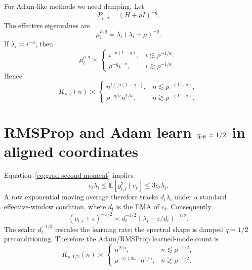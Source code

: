 \documentclass[11pt]{article}
\newcommand{\E}{\mathbb{E}}
\begin{document}
For Adam-like methods we need damping.  Let
\begin{equation}
    P_{\rho,q}=(H+\rho I)^{-q}.
\end{equation}
The effective eigenvalues are
\begin{equation}
    \mu_i^{\rho,q}=\lambda_i(\lambda_i+\rho)^{-q}.
\end{equation}
If $\lambda_i\asymp i^{-a}$, then
\begin{equation}
\label{eq:two-slope-q}
    \mu_i^{\rho,q}\asymp
    \begin{cases}
        i^{-a(1-q)}, & i\lesssim \rho^{-1/a},\\
        \rho^{-q}i^{-a}, & i\gtrsim \rho^{-1/a}.
    \end{cases}
\end{equation}
Hence
\begin{equation}
\label{eq:k-rho-q}
K_{\rho,q}(n)
\asymp
\begin{cases}
    n^{1/[a(1-q)]}, & n\lesssim \rho^{-(1-q)},\\
    \rho^{-q/a}n^{1/a}, & n\gtrsim \rho^{-(1-q)}.
\end{cases}
\end{equation}

\section{RMSProp and Adam learn $q_{\rm eff}=1/2$ in aligned coordinates}

Equation~\eqref{eq:grad-second-moment} implies
\begin{equation}
    c_t\lambda_i\le \E[g_{t,i}^2\mid e_t]\le 3c_t\lambda_i.
\end{equation}
A raw exponential moving average therefore tracks $d_t\lambda_i$ under a standard effective-window condition, where $d_t$ is the EMA of $c_t$.  Consequently
\begin{equation}
    (v_{t,i}+\epsilon)^{-1/2}
    \asymp
    d_t^{-1/2}(\lambda_i+\epsilon/d_t)^{-1/2}.
\end{equation}
The scalar $d_t^{-1/2}$ rescales the learning rate; the spectral shape is damped $q=1/2$ preconditioning.  Therefore the Adam/RMSProp learned-mode count is
\begin{equation}
\label{eq:adam-count}
K_{\rho,1/2}(n)
\asymp
\begin{cases}
    n^{2/a}, & n\lesssim \rho^{-1/2},\\
    \rho^{-1/(2a)}n^{1/a}, & n\gtrsim \rho^{-1/2}.
\end{cases}
\end{equation}
\end{document}
